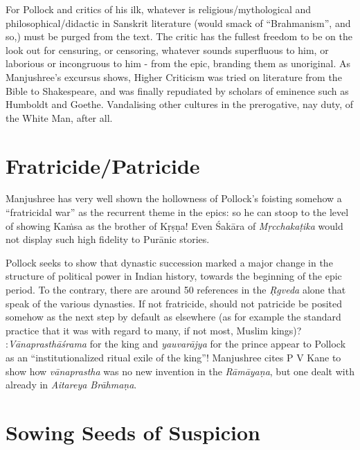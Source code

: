 For Pollock and critics of his ilk, whatever is religious/mythological and philosophical/didactic in Sanskrit literature (would smack of “Brahmanism”, and so,) must be purged from the text. The critic has the fullest freedom to be on the look out for censuring, or censoring, whatever sounds superfluous to him, or laborious or incongruous to him - from the epic, branding them as unoriginal. As Manjushree's excursus shows, Higher Criticism was tried on literature from the Bible to Shakespeare, and was finally repudiated by scholars of eminence such as Humboldt and Goethe. Vandalising other cultures in the prerogative, nay duty, of the White Man, after all.

\section*{Fratricide/Patricide}

Manjushree has very well shown the hollowness of Pollock's foisting somehow a “fratricidal war” as the recurrent theme in the epics: so he can stoop to the level of showing Kaṁsa as the brother of Kṛṣṇa! Even Śakāra of {\sl Mṛcchakaṭika} would not display such high fidelity to Purānic stories.

Pollock seeks to show that dynastic succession marked a major change in the structure of political power in Indian history, towards the beginning of the epic period. To the contrary, there are around 50 references in the {\sl Ṛgveda} alone that speak of the various dynasties. If not fratricide, should not patricide be posited somehow as the next step by default as elsewhere (as for example the standard practice that it was with regard to many, if not most, Muslim kings)? :{\sl Vānaprasthāśrama} for the king and {\sl yauvarājya} for the prince appear to Pollock as an “institutionalized ritual exile of the king”! Manjushree cites P V Kane to show how {\sl vānaprastha} was no new invention in the {\sl Rāmāyaṇa}, but one dealt with already in {\sl Aitareya Brāhmaṇa}.

\section*{Sowing Seeds of Suspicion}

